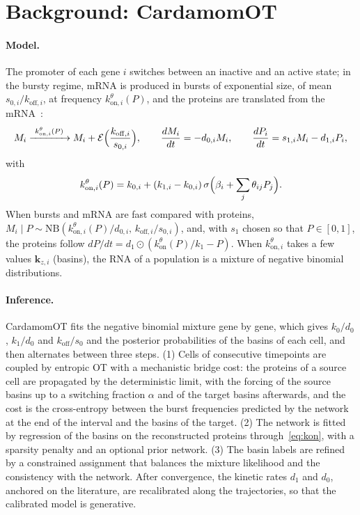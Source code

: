 \documentclass[a4paper, 11pt]{article}
\newcommand{\kon}{k_{\mathrm{on}}^{\theta}}
\newcommand{\koni}{k_{\mathrm{on},i}^{\theta}}
\theoremstyle{plain}
\theoremstyle{remark}
\begin{document}
\section{Background: CardamomOT}\label{sec:background}

\paragraph{Model.} The promoter of each gene $i$ switches between an inactive and an active state; in the bursty regime, mRNA is produced in bursts of exponential size, of mean $s_{0,i}/k_{\mathrm{off},i}$, at frequency $\koni(P)$, and the proteins are translated from the mRNA~\cite{peccoud1995markovian, herbachinferring2017}:
\begin{equation}\label{eq:pdmp}
M_i \xrightarrow{\ \koni(P)\ } M_i + \mathcal{E}\Bigl(\frac{k_{\mathrm{off},i}}{s_{0,i}}\Bigr), \qquad
\frac{dM_i}{dt} = -d_{0,i}M_i, \qquad \frac{dP_i}{dt} = s_{1,i}M_i - d_{1,i}P_i,
\end{equation}
with
\begin{equation}\label{eq:kon}
\koni(P) = k_{0,i} + (k_{1,i} - k_{0,i})\,\sigma\Bigl(\beta_i + \sum_j \theta_{ij}P_j\Bigr).
\end{equation}
When bursts and mRNA are fast compared with proteins, $M_i \mid P \sim \mathrm{NB}(\koni(P)/d_{0,i},\, k_{\mathrm{off},i}/s_{0,i})$, and, with $s_1$ chosen so that $P \in [0,1]$, the proteins follow $dP/dt = d_1 \odot (\kon(P)/k_1 - P)$. When $\koni$ takes a few values $\mathbf{k}_{z,i}$ (basins), the RNA of a population is a mixture of negative binomial distributions.

\paragraph{Inference.} CardamomOT fits the negative binomial mixture gene by gene, which gives $k_0/d_0$, $k_1/d_0$ and $k_{\mathrm{off}}/s_0$ and the posterior probabilities of the basins of each cell, and then alternates between three steps. (1) Cells of consecutive timepoints are coupled by entropic OT with a mechanistic bridge cost: the proteins of a source cell are propagated by the deterministic limit, with the forcing of the source basins up to a switching fraction $\alpha$ and of the target basins afterwards, and the cost is the cross-entropy between the burst frequencies predicted by the network at the end of the interval and the basins of the target. (2) The network is fitted by regression of the basins on the reconstructed proteins through~\eqref{eq:kon}, with a sparsity penalty and an optional prior network. (3) The basin labels are refined by a constrained assignment that balances the mixture likelihood and the consistency with the network. After convergence, the kinetic rates $d_1$ and $d_0$, anchored on the literature, are recalibrated along the trajectories, so that the calibrated model is generative.
\end{document}
